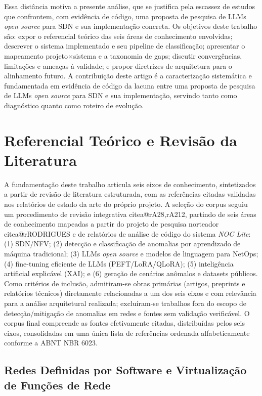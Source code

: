 \documentclass[12pt,a4paper]{article}
\makeatletter
\newcommand{\citea}[1]{\begingroup\edef\@currentlabel{\csname citea@#1\endcsname}\@currentlabel\endgroup}
\makeatother
\begin{document}
Essa distância motiva a presente análise, que se justifica pela escassez de
estudos que confrontem, com evidência de código, uma proposta de pesquisa de
LLMs \textit{open source} para SDN e sua implementação concreta. Os
objetivos deste trabalho são: expor o referencial teórico das seis áreas de
conhecimento envolvidas; descrever o sistema implementado e seu pipeline de
classificação; apresentar o mapeamento projeto$\times$sistema e a taxonomia
de gaps; discutir convergências, limitações e ameaças à validade; e propor
diretrizes de arquitetura para o alinhamento futuro. A contribuição deste
artigo é a caracterização sistemática e fundamentada em evidência de código
da lacuna entre uma proposta de pesquisa de LLMs \textit{open source} para
SDN e sua implementação, servindo tanto como diagnóstico quanto como
roteiro de evolução.

\section{Referencial Teórico e Revisão da Literatura}
\label{sec:referencial}

A fundamentação deste trabalho articula seis eixos de conhecimento,
sintetizados a partir de revisão de literatura estruturada, com as
referências citadas validadas nos relatórios de estado da arte do próprio
projeto. A seleção do corpus seguiu um procedimento de revisão integrativa
\citea{rA28,rA212}, partindo de seis áreas de conhecimento mapeadas a partir
do projeto de pesquisa norteador \citea{rRODRIGUES} e de relatórios de
análise de código do sistema \textit{NOC Lite}: (1) SDN/NFV; (2) detecção e
classificação de anomalias por aprendizado de máquina tradicional; (3) LLMs
\textit{open source} e modelos de linguagem para NetOps; (4) fine-tuning
eficiente de LLMs (PEFT/LoRA/QLoRA); (5) inteligência artificial explicável
(XAI); e (6) geração de cenários anômalos e datasets públicos. Como
critérios de inclusão, admitiram-se obras primárias (artigos, preprints e
relatórios técnicos) diretamente relacionadas a um dos seis eixos e com
relevância para a análise arquitetural realizada; excluíram-se trabalhos
fora do escopo de detecção/mitigação de anomalias em redes e fontes sem
validação verificável. O corpus final compreende as fontes efetivamente
citadas, distribuídas pelos seis eixos, consolidadas em uma única lista de
referências ordenada alfabeticamente conforme a ABNT NBR 6023.

\subsection{Redes Definidas por Software e Virtualização de Funções de Rede}
\label{sec:sdn}
\end{document}

